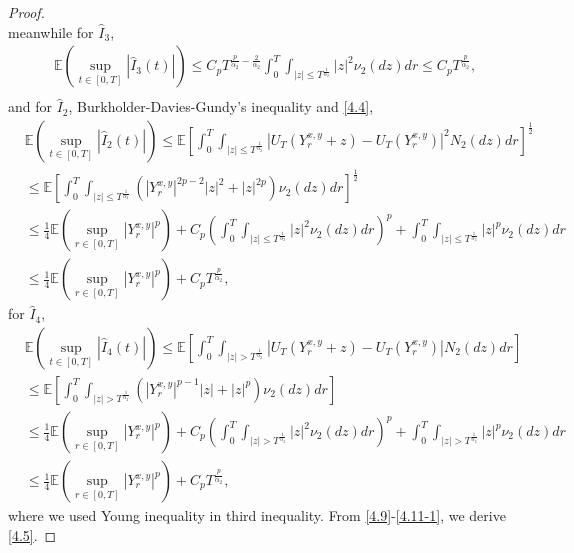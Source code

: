 \documentclass[10pt,a4paper]{amsart}
\begin{document}
\begin{proof}
\begin{equation}
	\end{equation}
	meanwhile for $\hat{I}_{3}$,
	\begin{equation}\label{4.10}
		\begin{split}
			&\mathbb{E}\left(\sup_{t\in [0,T]} |\hat{I}_{3}(t)|\right)\leq C_{p}T^{\frac{p}{\alpha_{2}}-\frac{2}{\alpha_{2}}}\int_{0}^{T}\int_{|z|\leq T^{\frac{1}{\alpha_{2}}}}|z|^{2}\nu_{2}(dz)dr\leq C_{p}T^{\frac{p}{\alpha_{2}}},\\
		\end{split}
	\end{equation}
	and for $\hat{I}_{2}$, Burkholder-Davies-Gundy's inequality and \eqref{4.4},
	\begin{equation}\label{4.11}
		\begin{split}
			&\mathbb{E}\left(\sup_{t\in [0,T]} |\hat{I}_{2}(t)|\right)\leq \mathbb{E}\left[ \int_{0}^{T} \int_{|z|\leq T^{\frac{1}{\alpha_{2}}}}\left|  U_{T}(Y_{r}^{ x,y}+z)-U_{T}(Y_{r}^{ x,y}) \right|^{2}  N_{2}(dz)dr\right] ^{\frac{1}{2}}\\
			&\leq \mathbb{E}\left[ \int_{0}^{T} \int_{|z|\leq T^{\frac{1}{\alpha_{2}}}}\left( \left| Y_{r}^{ x,y}  \right|^{2p-2}|z|^{2}+|z|^{2p} \right)  \nu_{2}(dz)dr\right] ^{\frac{1}{2}}\\
			&\leq \frac{1}{4}\mathbb{E} \left(\sup_{r\in [0,T]} |Y_{r}^{ x,y}|^{p}\right)+C_{p}\left(\int_{0}^{T} \int_{|z|\leq T^{\frac{1}{\alpha_{2}}}} |z|^{2}  \nu_{2}(dz)dr\right) ^{p}+\int_{0}^{T} \int_{|z|\leq T^{\frac{1}{\alpha_{2}}}} |z|^{p}  \nu_{2}(dz)dr\\
			&\leq \frac{1}{4}\mathbb{E} \left(\sup_{r\in [0,T]} |Y_{r}^{ x,y}|^{p}\right)+C_{p}T^{\frac{p}{\alpha_{2}}},
		\end{split}
	\end{equation}
	for $\hat{I}_{4}$,
	\begin{equation}\label{4.11-1}
	\begin{split}
		&\mathbb{E}\left(\sup_{t\in [0,T]} |\hat{I}_{4}(t)|\right)\leq \mathbb{E}\left[ \int_{0}^{T} \int_{|z|> T^{\frac{1}{\alpha_{2}}}}\left|  U_{T}(Y_{r}^{ x,y}+z)-U_{T}(Y_{r}^{ x,y}) \right|  N_{2}(dz)dr\right] \\
		&\leq \mathbb{E}\left[ \int_{0}^{T} \int_{|z|>T^{\frac{1}{\alpha_{2}}}}\left( \left| Y_{r}^{ x,y}  \right|^{p-1}|z|+|z|^{p} \right)  \nu_{2}(dz)dr\right]\\
		&\leq \frac{1}{4}\mathbb{E} \left(\sup_{r\in [0,T]} |Y_{r}^{ x,y}|^{p}\right)+C_{p}\left(\int_{0}^{T} \int_{|z|>T^{\frac{1}{\alpha_{2}}}} |z|^{2}  \nu_{2}(dz)dr\right) ^{p}+\int_{0}^{T} \int_{|z|> T^{\frac{1}{\alpha_{2}}}} |z|^{p}  \nu_{2}(dz)dr\\
		&\leq \frac{1}{4}\mathbb{E} \left(\sup_{r\in [0,T]} |Y_{r}^{ x,y}|^{p}\right)+C_{p}T^{\frac{p}{\alpha_{2}}},
	\end{split}
	\end{equation}
	where we used Young inequality in third inequality. From \eqref{4.9}-\eqref{4.11-1}, we derive \eqref{4.5}.
\end{proof}
\end{document}
